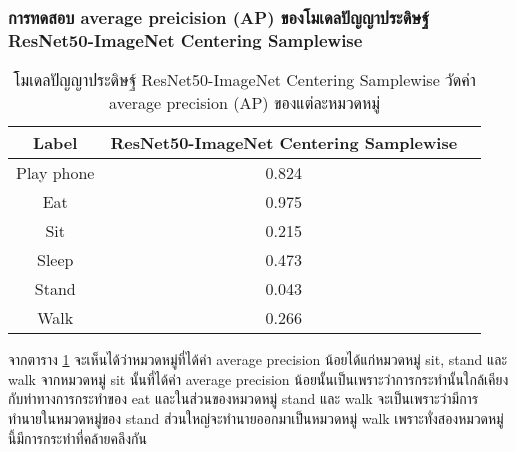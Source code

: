 \subsubsection{การทดสอบ average preicision (AP) ของโมเดลปัญญาประดิษฐ์ ResNet50-ImageNet Centering Samplewise}
\begin{table}[!ht]
	\centering
	\begin{tabular}{|c|c|c|}
			\hline
			{Label}&{ResNet50-ImageNet Centering Samplewise}			\\
			\hline
			Play phone				& 0.824			\\
			Eat						& 0.975			\\
			Sit						& 0.215			\\
			Sleep					& 0.473			\\
			Stand					& 0.043			\\
			Walk					& 0.266			\\
			\hline
	\end{tabular}
\caption{โมเดลปัญญาประดิษฐ์ ResNet50-ImageNet	 Centering Samplewise วัดค่า average precision (AP) ของแต่ละหมวดหมู่}
\label{tab: ResNet50-ImageNet Centering Samplewise average precision}
\end{table}

จากตาราง \ref{tab: ResNet50-ImageNet Centering Samplewise average precision} จะเห็นได้ว่าหมวดหมู่ที่ได้ค่า average precision น้อยได้แก่หมวดหมู่ sit, stand และ walk จากหมวดหมู่ sit นั้นที่ได้ค่า  average precision น้อยนั้นเป็นเพราะว่าการกระทำนั้นใกล้เคียงกับท่าทางการกระทำของ eat และในส่วนของหมวดหมู่ stand และ walk จะเป็นเพราะว่ามีการทำนายในหมวดหมู่ของ stand ส่วนใหญ่จะทำนายออกมาเป็นหมวดหมู่ walk เพราะทั่งสองหมวดหมู่นี้มีการกระทำที่คล้ายคลึงกัน

